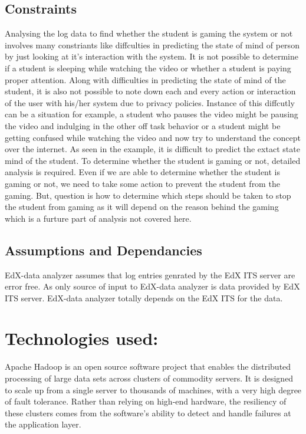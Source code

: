 \documentclass[a4paper,12pt,oneside]{sphinxmanual}
\begin{document}
\section{\textbf{Constraints}}
\label{document:constraints}
Analysing the log data to find whether the student is gaming the system or not involves many constriants like diffculties in predicting the state of mind of person by just looking at it's interaction with the system. It is not possible to determine if a student is sleeping while watching the video or whether a student is paying proper attention. Along with difficulties in predicting the state of mind of the student, it is also not possible to note down each and every action or interaction of the user with his/her system due to privacy policies. Instance of this diffcutly can be a situation for example, a student who pauses the video might be pausing the video and indulging in the other off task behavior or a student might be getting confused while watching the video and now try to understand the concept over the internet. As seen in the example, it is difficult to predict the extact state mind of the student. To determine whether the student is gaming or not, detailed analysis is required. Even if we are able to determine whether the student is gaming or not,  we need to take some action to prevent the student from the gaming. But, question is how to determine which steps should be taken to stop the student from gaming as it will depend on the reason behind the gaming which is a furture part of analysis not covered here.


\section{\textbf{Assumptions and Dependancies}}
\label{document:assumptions-and-dependancies}
EdX-data analyzer assumes that log entries genrated by the EdX ITS server are error free. As only source of input to EdX-data analyzer is data provided by EdX ITS server. EdX-data analyzer totally depends on the EdX ITS for the data.


\chapter{\textbf{Technologies used:}}
\label{document:technologies-used}
Apache Hadoop is an open source software project that enables the distributed processing of large data sets across clusters of commodity servers. It is designed to scale up from a single server to thousands of machines, with a very high degree of fault tolerance. Rather than relying on high-end hardware, the resiliency of these clusters comes from the software’s ability to detect and handle failures at the application layer.
\end{document}
